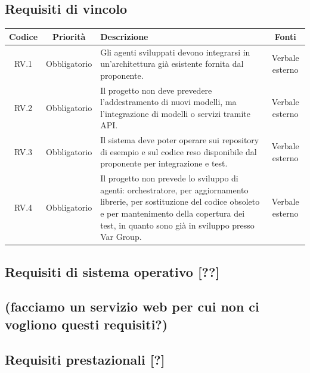 \documentclass[12pt, a4paper]{article}
\begin{document}
\subsection{Requisiti di vincolo}\label{requisiti-di-vincolo}

\begin{table}[ht]
    \centering
    \renewcommand{\arraystretch}{1.3}
    \begin{tabularx}{\textwidth}{|c|c|X|c|}
        \hline
        \textbf{Codice} & \textbf{Priorità} & \textbf{Descrizione} & \textbf{Fonti} \\ \hline
        RV.1 & Obbligatorio & Gli agenti sviluppati devono integrarsi in un'architettura già esistente
        fornita dal proponente. & Verbale esterno \\ \hline
        RV.2 & Obbligatorio & Il progetto non deve prevedere l'addestramento di nuovi modelli, ma
        l'integrazione di modelli o servizi tramite API. & Verbale esterno \\ \hline
        RV.3 & Obbligatorio & Il sistema deve poter operare sui repository di esempio e sul codice
        reso disponibile dal proponente per integrazione e test. & Verbale esterno \\ \hline
        RV.4 & Obbligatorio & Il progetto non prevede lo sviluppo di agenti: orchestratore, per
        aggiornamento librerie, per sostituzione del codice obsoleto e per
        mantenimento della copertura dei test, in quanto sono già in sviluppo
        presso Var Group. & Verbale esterno \\ \hline
    \end{tabularx}
\end{table}

\subsection{\texorpdfstring{Requisiti di sistema operativo {[}??{]}
}{Requisiti di sistema operativo {[}??{]} }}\label{requisiti-di-sistema-operativo}

\subsection{(facciamo un servizio web per cui non ci vogliono questi
requisiti?)}\label{facciamo-un-servizio-web-per-cui-non-ci-vogliono-questi-requisiti}

\subsection{Requisiti prestazionali
{[}?{]}}\label{requisiti-prestazionali}
\end{document}
